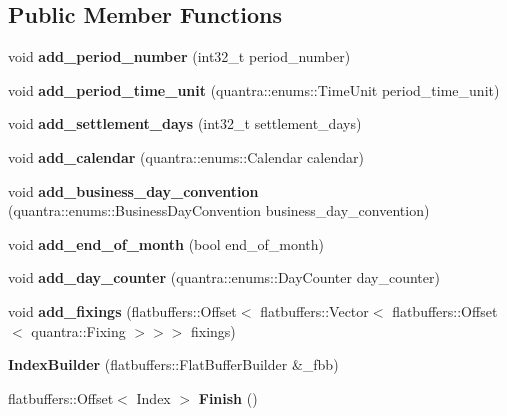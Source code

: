 \subsection*{Public Member Functions}
\begin{DoxyCompactItemize}
\item 
\mbox{\label{structquantra_1_1IndexBuilder_a4a6bcc170461cda8eaf898ce4567e3f1}} 
void {\bfseries add\+\_\+period\+\_\+number} (int32\+\_\+t period\+\_\+number)
\item 
\mbox{\label{structquantra_1_1IndexBuilder_a780885a1f25dcccf5b44a310f5fe4cf0}} 
void {\bfseries add\+\_\+period\+\_\+time\+\_\+unit} (quantra\+::enums\+::\+Time\+Unit period\+\_\+time\+\_\+unit)
\item 
\mbox{\label{structquantra_1_1IndexBuilder_adaf31c12d11c767234e921aca49e0b6a}} 
void {\bfseries add\+\_\+settlement\+\_\+days} (int32\+\_\+t settlement\+\_\+days)
\item 
\mbox{\label{structquantra_1_1IndexBuilder_acfd89b9310647c895d9226a873894a25}} 
void {\bfseries add\+\_\+calendar} (quantra\+::enums\+::\+Calendar calendar)
\item 
\mbox{\label{structquantra_1_1IndexBuilder_a943f83e5380d68a51b7ef6f59344f91b}} 
void {\bfseries add\+\_\+business\+\_\+day\+\_\+convention} (quantra\+::enums\+::\+Business\+Day\+Convention business\+\_\+day\+\_\+convention)
\item 
\mbox{\label{structquantra_1_1IndexBuilder_aa3cef345821a6966c3ef4b5a4a0844c6}} 
void {\bfseries add\+\_\+end\+\_\+of\+\_\+month} (bool end\+\_\+of\+\_\+month)
\item 
\mbox{\label{structquantra_1_1IndexBuilder_a0ec188a47dd9335334339ee70d3ad8b4}} 
void {\bfseries add\+\_\+day\+\_\+counter} (quantra\+::enums\+::\+Day\+Counter day\+\_\+counter)
\item 
\mbox{\label{structquantra_1_1IndexBuilder_ab4f0ea7d05879dc406fb08edf8bfe866}} 
void {\bfseries add\+\_\+fixings} (flatbuffers\+::\+Offset$<$ flatbuffers\+::\+Vector$<$ flatbuffers\+::\+Offset$<$ quantra\+::\+Fixing $>$$>$$>$ fixings)
\item 
\mbox{\label{structquantra_1_1IndexBuilder_aec85cb134b8e44e191e7c35c59ad8298}} 
{\bfseries Index\+Builder} (flatbuffers\+::\+Flat\+Buffer\+Builder \&\+\_\+fbb)
\item 
\mbox{\label{structquantra_1_1IndexBuilder_a3187d50fc27bdfae369f85983cdffaf8}} 
flatbuffers\+::\+Offset$<$ Index $>$ {\bfseries Finish} ()
\end{DoxyCompactItemize}
